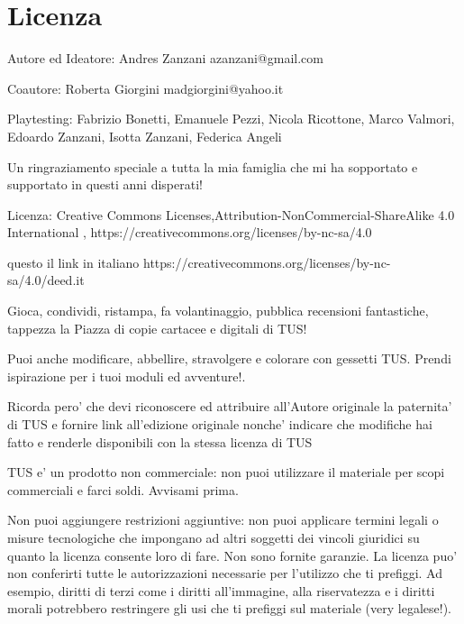\documentclass[a4paper,11pt,twoside,openany]{book}
\begin{document}
{\section{Licenza}

\bigskip

Autore ed Ideatore: Andres Zanzani azanzani@gmail.com

\bigskip
Coautore: Roberta Giorgini madgiorgini@yahoo.it


Playtesting: Fabrizio Bonetti, Emanuele Pezzi, Nicola Ricottone, Marco Valmori, Edoardo Zanzani, Isotta Zanzani, Federica Angeli

\bigskip

Un ringraziamento speciale a tutta la mia famiglia che mi ha sopportato e supportato in questi anni disperati!

\bigskip

Licenza: Creative Commons Licenses,Attribution-NonCommercial-ShareAlike 4.0 International , https://creativecommons.org/licenses/by-nc-sa/4.0

questo il link in italiano https://creativecommons.org/licenses/by-nc-sa/4.0/deed.it

Gioca, condividi, ristampa, fa volantinaggio, pubblica recensioni fantastiche, tappezza la Piazza di copie cartacee e digitali di TUS!

Puoi anche modificare, abbellire, stravolgere e colorare con gessetti TUS. Prendi ispirazione per i tuoi moduli ed avventure!.

Ricorda pero' che devi riconoscere ed attribuire all'Autore originale la paternita' di TUS e fornire link all'edizione originale nonche' indicare che modifiche hai fatto e renderle disponibili con la stessa licenza di TUS

\bigskip
TUS e' un prodotto non commerciale: non puoi utilizzare il materiale per scopi commerciali e farci soldi. Avvisami prima.

\bigskip
Non puoi aggiungere restrizioni aggiuntive: non puoi applicare termini legali o misure tecnologiche che impongano ad altri soggetti dei vincoli giuridici su quanto la licenza consente loro di fare. Non sono fornite garanzie. La licenza puo' non conferirti tutte le autorizzazioni necessarie per l'utilizzo che ti prefiggi. Ad esempio, diritti di terzi come i diritti all'immagine, alla riservatezza e i diritti morali potrebbero restringere gli usi che ti prefiggi sul materiale (very legalese!).

}
\end{document}
